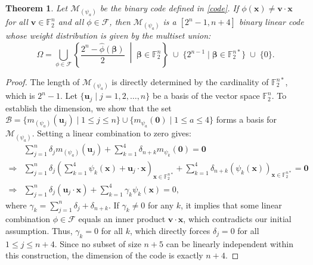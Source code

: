 \documentclass[pdflatex,sn-mathphys-num]{sn-jnl}%
\theoremstyle{thmstyleone}%
\newtheorem{theorem}{Theorem}%
\theoremstyle{thmstyletwo}%
\theoremstyle{thmstylethree}%
\begin{document}
\begin{theorem}\label{C_weight}
Let $\mathcal{M}_{(\psi_a)}$ be the binary code defined in \eqref{code}. If $\phi(\mathbf{x})\neq \mathbf{v}\cdot \mathbf{x}$ for all $\mathbf{v} \in \mathbb{F}_2^n$ and all $\phi \in \mathcal{F}$, then $\mathcal{M}_{(\psi_a)}$ is a $[2^n-1, n+4]$ binary linear code whose weight distribution is given by the multiset union:
\begin{equation}\label{eq:multiset_weight}
\Omega = \bigcup_{\phi \in \mathcal{F}} \left\{ \frac{2^{n} - \hat{\phi}(\mathbf{\beta})}{2} \;\middle|\; \mathbf{\beta} \in \mathbb{F}_{2}^{n} \right\} \;\cup\; \{2^{n-1} \mid \mathbf{\beta} \in \mathbb{F}_{2}^{n*}\} \;\cup\; \{0\}.
\end{equation}
\end{theorem}

\begin{proof}
The length of $\mathcal{M}_{(\psi_a)}$ is directly determined by the cardinality of $\mathbb{F}_2^{n*}$, which is $2^n - 1$. Let $\{\mathbf{u}_j \mid j = 1,2,\ldots,n\}$ be a basis of the vector space $\mathbb{F}_2^n$. To establish the dimension, we show that the set $\mathcal{B} = \{m_{(\psi_a)}(\mathbf{u}_j) \mid 1 \leq j \leq n\} \cup \{m_{\psi_a}(\mathbf{0}) \mid 1 \leq a \leq 4\}$ forms a basis for $\mathcal{M}_{(\psi_a)}$. Setting a linear combination to zero gives:
\begin{align*}
&\sum_{j=1}^{n} \delta_j m_{(\psi_a)}(\mathbf{u}_j) + \sum_{k=1}^{4} \delta_{n+k} m_{\psi_k}(\mathbf{0}) = \mathbf{0}\\
\Rightarrow & \sum_{j=1}^{n} \delta_j 
\left(
\sum_{k=1}^{4} \psi_k(\mathbf{x}) + \mathbf{u}_j \cdot \mathbf{x}
\right)_{\mathbf{x} \in \mathbb{F}_2^{n*}}
+ \sum_{k=1}^{4} \delta_{n+k} (\psi_k(\mathbf{x}))_{\mathbf{x} \in \mathbb{F}_2^{n*}} = \mathbf{0}\\
\Rightarrow &\sum_{j=1}^{n} \delta_j (\mathbf{u}_j \cdot \mathbf{x}) + \sum_{k=1}^{4} \gamma_k \psi_k(\mathbf{x}) = 0, 
\end{align*}
where $\gamma_k = \sum_{j=1}^{n} \delta_j + \delta_{n+k}$. If $\gamma_k \neq 0$ for any $k$, it implies that some linear combination $\phi \in \mathcal{F}$ equals an inner product $\mathbf{v} \cdot \mathbf{x}$, which contradicts our initial assumption. Thus, $\gamma_k = 0$ for all $k$, which directly forces $\delta_j = 0$ for all $1 \leq j \leq n+4$. Since no subset of size $n+5$ can be linearly independent within this construction, the dimension of the code is exactly $n+4$. 


\end{proof}
\end{document}

